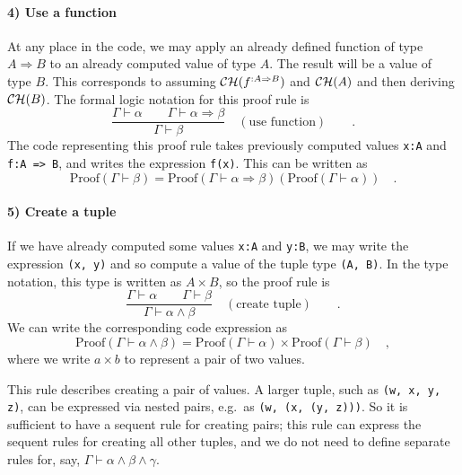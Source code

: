 \paragraph{4) Use a function}

At any place in the code, we may apply an already defined function
of type $A\Rightarrow B$ to an already computed value of type $A$.
The result will be a value of type $B$. This corresponds to assuming
${\cal CH}(f^{:A\Rightarrow B})$ and ${\cal CH}(A)$ and then deriving
${\cal CH}(B)$. The formal logic notation for this proof rule is
\[
\frac{\Gamma\vdash\alpha\quad\quad\Gamma\vdash\alpha\Rightarrow\beta}{\Gamma\vdash\beta}\quad(\text{use function})\quad\quad.
\]
The code representing this proof rule takes previously computed values
\lstinline!x:A! and \lstinline!f:A => B!,
and writes the expression \lstinline!f(x)!.
This can be written as 
\[
\text{Proof}(\Gamma\vdash\beta)=\text{Proof}\left(\Gamma\vdash\alpha\Rightarrow\beta\right)(\text{Proof}(\Gamma\vdash\alpha))\quad.
\]


\paragraph{5) Create a tuple}

If we have already computed some values \lstinline!x:A!
and \lstinline!y:B!, we
may write the expression \lstinline!(x, y)!
and so compute a value of the tuple type \lstinline!(A, B)!.
In the type notation, this type is written as $A\times B$, so the
proof rule is
\[
\frac{\Gamma\vdash\alpha\quad\quad\Gamma\vdash\beta}{\Gamma\vdash\alpha\wedge\beta}\quad(\text{create tuple})\quad\quad.
\]
We can write the corresponding code expression as
\[
\text{Proof}\left(\Gamma\vdash\alpha\wedge\beta\right)=\text{Proof}\left(\Gamma\vdash\alpha\right)\times\text{Proof}\left(\Gamma\vdash\beta\right)\quad,
\]
where we write $a\times b$ to represent a pair of two values.

This rule describes creating a pair of values. A larger tuple, such
as \lstinline!(w, x, y, z)!,
can be expressed via nested pairs, e.g.~as \lstinline!(w, (x, (y, z)))!.
So it is sufficient to have a sequent rule for creating pairs; this
rule can express the sequent rules for creating all other tuples,
and we do not need to define separate rules for, say, $\Gamma\vdash\alpha\wedge\beta\wedge\gamma$.

